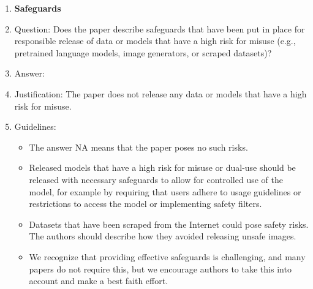 \begin{enumerate}
\item {\bf Safeguards}
\item[] Question: Does the paper describe safeguards that have been put in place for responsible release of data or models that have a high risk for misuse (e.g., pretrained language models, image generators, or scraped datasets)?
\item[] Answer: \answerNA{}
\item[] Justification: The paper does not release any data or models that have a high risk for misuse.
\item[] Guidelines:
  \begin{itemize}
  \item The answer NA means that the paper poses no such risks.
  \item Released models that have a high risk for misuse or dual-use should be released with necessary safeguards to allow for controlled use of the model, for example by requiring that users adhere to usage guidelines or restrictions to access the model or implementing safety filters.
  \item Datasets that have been scraped from the Internet could pose safety risks. The authors should describe how they avoided releasing unsafe images.
  \item We recognize that providing effective safeguards is challenging, and many papers do not require this, but we encourage authors to take this into account and make a best faith effort.
  \end{itemize}


\end{enumerate}
